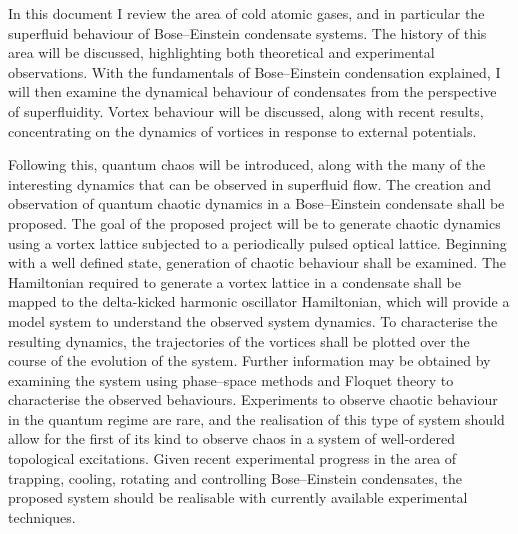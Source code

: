 In this document I review the area of cold atomic gases, and in particular the superfluid behaviour of Bose--Einstein condensate systems. The history of this area will be discussed, highlighting both theoretical and experimental observations. With the fundamentals of Bose--Einstein condensation explained, I will then examine the dynamical behaviour of condensates from the perspective of superfluidity. Vortex behaviour will be discussed, along with recent results, concentrating on the dynamics of vortices in response to external potentials.

 Following this, quantum chaos will be introduced, along with the many of the interesting dynamics that can be observed in superfluid flow. The creation and observation of quantum chaotic dynamics in a Bose--Einstein condensate shall be proposed. The goal of the proposed project will be to generate chaotic dynamics using a vortex lattice subjected to a periodically pulsed optical lattice. Beginning with a well defined state, generation of chaotic behaviour shall be examined. The Hamiltonian required to generate a vortex lattice in a condensate shall be mapped to the delta-kicked harmonic oscillator Hamiltonian, which will provide a model system to understand the observed system dynamics. To characterise the resulting dynamics, the trajectories of the vortices shall be plotted over the course of the evolution of the system. Further information may be obtained by examining the system using phase--space methods and Floquet theory to characterise the observed behaviours. Experiments to observe chaotic behaviour in the quantum regime are rare, and the realisation of this type of system should allow for the first of its kind to observe chaos in a system of well-ordered topological excitations. Given recent experimental progress in the area of trapping, cooling, rotating and controlling Bose--Einstein condensates, the proposed system should be realisable with currently available experimental techniques.
